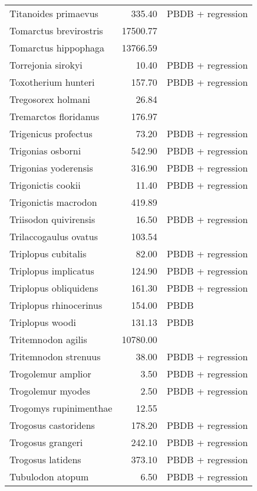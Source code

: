 \begin{table}[ht]
\begin{tabular}{lrl}
  Titanoides primaevus & 335.40 & PBDB + regression \\ 
  Tomarctus brevirostris & 17500.77 & \cite{Tomiya2013} \\ 
  Tomarctus hippophaga & 13766.59 & \cite{Tomiya2013} \\ 
  Torrejonia sirokyi & 10.40 & PBDB + regression \\ 
  Toxotherium hunteri & 157.70 & PBDB + regression \\ 
  Tregosorex holmani & 26.84 & \cite{Tomiya2013} \\ 
  Tremarctos floridanus & 176.97 & \cite{Smith2004} \\ 
  Trigenicus profectus & 73.20 & PBDB + regression \\ 
  Trigonias osborni & 542.90 & PBDB + regression \\ 
  Trigonias yoderensis & 316.90 & PBDB + regression \\ 
  Trigonictis cookii & 11.40 & PBDB + regression \\ 
  Trigonictis macrodon & 419.89 & \cite{Tomiya2013} \\ 
  Triisodon quivirensis & 16.50 & PBDB + regression \\ 
  Trilaccogaulus ovatus & 103.54 & \cite{Tomiya2013} \\ 
  Triplopus cubitalis & 82.00 & PBDB + regression \\ 
  Triplopus implicatus & 124.90 & PBDB + regression \\ 
  Triplopus obliquidens & 161.30 & PBDB + regression \\ 
  Triplopus rhinocerinus & 154.00 & PBDB \\ 
  Triplopus woodi & 131.13 & PBDB \\ 
  Tritemnodon agilis & 10780.00 & \cite{Egi2001} \\ 
  Tritemnodon strenuus & 38.00 & PBDB + regression \\ 
  Trogolemur amplior & 3.50 & PBDB + regression \\ 
  Trogolemur myodes & 2.50 & PBDB + regression \\ 
  Trogomys rupinimenthae & 12.55 & \cite{Tomiya2013} \\ 
  Trogosus castoridens & 178.20 & PBDB + regression \\ 
  Trogosus grangeri & 242.10 & PBDB + regression \\ 
  Trogosus latidens & 373.10 & PBDB + regression \\ 
  Tubulodon atopum & 6.50 & PBDB + regression \\ 

\end{tabular}
\end{table}
